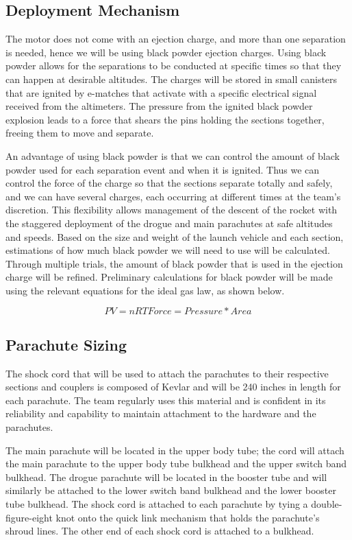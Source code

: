     \subsection{Deployment Mechanism}
The motor does not come with an ejection charge, and more than one separation is needed, hence we will be using black powder ejection charges. Using black powder allows for the separations to be conducted at specific times so that they can happen at desirable altitudes. The charges will be stored in small canisters that are ignited by e-matches that activate with a specific electrical signal received from the altimeters. The pressure from the ignited black powder explosion leads to a force that shears the pins holding the sections together, freeing them to move and separate. 

An advantage of using black powder is that we can control the amount of black powder used for each separation event and when it is ignited. Thus we can control the force of the charge so that the sections separate totally and safely, and we can have several charges, each occurring at different times at the team’s discretion. This flexibility allows management of the descent of the rocket with the staggered deployment of the drogue and main parachutes at safe altitudes and speeds. Based on the size and weight of the launch vehicle and each section, estimations of how much black powder we will need to use will be calculated. Through multiple trials, the amount of black powder that is used in the ejection charge will be refined. Preliminary calculations for black powder will be made using the relevant equations for the ideal gas law, as shown below.

\begin{equation}
PV = nRT
Force = Pressure* Area
\end{equation}

    \subsection{Parachute Sizing}
The shock cord that will be used to attach the parachutes to their respective sections and couplers is composed of Kevlar and will be 240 inches in length for each parachute. The team regularly uses this material and is confident in its reliability and capability to maintain attachment to the hardware and the parachutes.

The main parachute will be located in the upper body tube; the cord will attach the main parachute to the upper body tube bulkhead and the upper switch band bulkhead. The drogue parachute will be located in the booster tube and will similarly be attached to the lower switch band bulkhead and the lower booster tube bulkhead. The shock cord is attached to each parachute by tying a double-figure-eight knot onto the quick link mechanism that holds the parachute’s shroud lines. The other end of each shock cord is attached to a bulkhead. 

